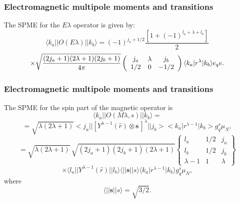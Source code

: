 \documentclass{beamer}
\begin{document}
\begin{frame}
\frametitle{Electromagnetic multipole moments and transitions}

\begin{block}{}
The SPME for the $  E\lambda   $ operator is given by:
\[
\langle k_{a}\vert\vert O(E\lambda )\vert\vert k_{b}\rangle=(-1)^{j_{a}+1/2}\frac{[1+(-1)^{l_{a}+\lambda +l_{b}}]}{2}
\]
\[
 \times\sqrt{ {(2j_{a}+1)(2\lambda +1)(2j_{b}+1)\over4\pi }}\left(\begin{array}{ccc}  {j_{a}}&  {\lambda} &  {j_{b}}\\  {1/2} & {0}&  {-1/2}\end{array}\right)\langle k_{a}\vert r^{\lambda }\vert k_{b}\rangle e_{q} e.
\]
\end{block}
\end{frame}

\begin{frame}
\frametitle{Electromagnetic multipole moments and transitions}

\begin{block}{}
The SPME for the spin part of the magnetic operator is
\[
\langle k_{a}\vert\vert O(M\lambda ,s)\vert\vert k_{b}\rangle =
\]
\[
=\sqrt{\lambda (2\lambda +1)}<j_{a}\vert\vert [Y^{\lambda -1}(\hat{r})\otimes\mathbf{s}\,]^{\lambda }\vert\vert j_{b}><k_{a}\vert r^{\lambda -1}\vert k_{b}>g^{s}_{q}\mu _{N},
\]
\[
= \sqrt{\lambda (2\lambda +1)}\, \sqrt{(2j_{a}+1)(2j_{b}+1)(2\lambda +1)}\left\{\begin{array}{ccc}  {l _{a}}&  {1/2} & {j_{a}}\\  {l _{b}}&  {1/2} & {j_{b}}\\  {\lambda -1} & {1} & {\lambda}\end{array}\right\}
\]
\[
\times \langle l _{a}\vert\vert Y^{\lambda -1}(\hat{r})\vert\vert l _{b}\rangle\langle\vert\vert \mathbf{s}\vert\vert s\rangle\langle k_{a}\vert r^{\lambda -1}\vert k_{b}\rangle g^{s}_{q}\mu _{N},
\]
where
\[
\langle\vert\vert \mathbf{s}\vert\vert s\rangle = \sqrt{3/2}.
\]
\end{block}
\end{frame}
\end{document}
